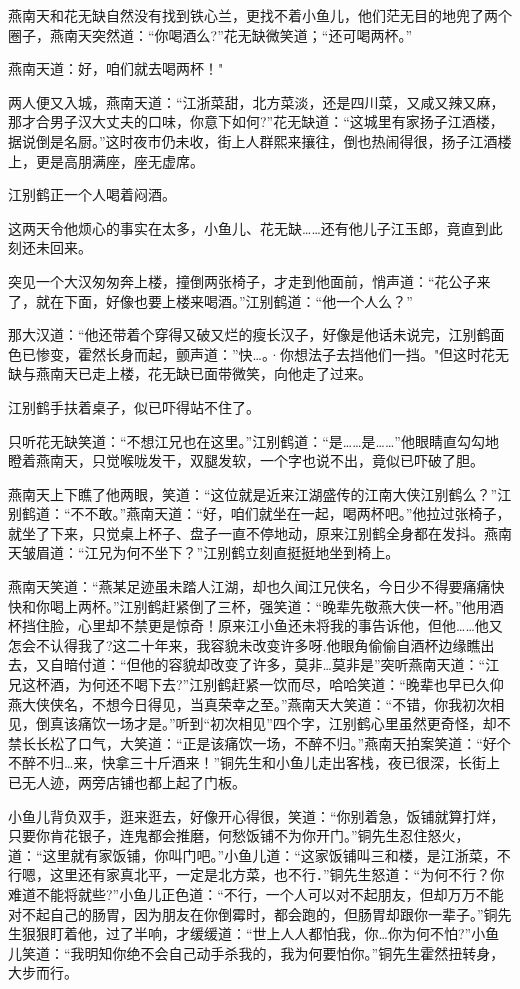 \documentclass[12pt,oneside]{book}
\begin{document}
燕南天和花无缺自然没有找到铁心兰，更找不着小鱼儿，他们茫无目的地兜了两个圈子，燕南天突然道：``你喝酒么?''花无缺微笑道；``还可喝两杯。''

燕南天道：好，咱们就去喝两杯！"

两人便又入城，燕南天道：``江浙菜甜，北方菜淡，还是四川菜，又咸又辣又麻，那才合男子汉大丈夫的口味，你意下如何?''花无缺道：``这城里有家扬子江酒楼，据说倒是名厨。''这时夜市仍未收，街上人群熙来攘往，倒也热闹得很，扬子江酒楼上，更是高朋满座，座无虚席。

江别鹤正一个人喝着闷酒。

这两天令他烦心的事实在太多，小鱼儿、花无缺\ldots\ldots 还有他儿子江玉郎，竟直到此刻还未回来。

突见一个大汉匆匆奔上楼，撞倒两张椅子，才走到他面前，悄声道：``花公子来了，就在下面，好像也要上楼来喝酒。''江别鹤道：``他一个人么？''

那大汉道：``他还带着个穿得又破又烂的瘦长汉子，好像是他话未说完，江别鹤面色已惨变，霍然长身而起，颤声道：''快\ldots。·你想法子去挡他们一挡。"但这时花无缺与燕南天已走上楼，花无缺已面带微笑，向他走了过来。

江别鹤手扶着桌子，似已吓得站不住了。

只听花无缺笑道：``不想江兄也在这里。''江别鹤道：``是\ldots\ldots 是\ldots\ldots{}''他眼睛直勾勾地瞪着燕南天，只觉喉咙发干，双腿发软，一个字也说不出，竟似已吓破了胆。

燕南天上下瞧了他两眼，笑道：``这位就是近来江湖盛传的江南大侠江别鹤么？''江别鹤道：``不不敢。''燕南天道：``好，咱们就坐在一起，喝两杯吧。''他拉过张椅子，就坐了下来，只觉桌上杯子、盘子一直不停地动，原来江别鹤全身都在发抖。燕南天皱眉道：``江兄为何不坐下？''江别鹤立刻直挺挺地坐到椅上。

燕南天笑道：``燕某足迹虽未踏人江湖，却也久闻江兄侠名，今日少不得要痛痛快快和你喝上两杯。''江别鹤赶紧倒了三杯，强笑道：``晚辈先敬燕大侠一杯。''他用酒杯挡住脸，心里却不禁更是惊奇！原来江小鱼还未将我的事告诉他，但他\ldots\ldots 他又怎会不认得我了?这二十年来，我容貌未改变许多呀.他眼角偷偷自酒杯边缘瞧出去，又自暗付道：``但他的容貌却改变了许多，莫非\ldots 莫非是''突听燕南天道：``江兄这杯酒，为何还不喝下去?''江别鹤赶紧一饮而尽，哈哈笑道：``晚辈也早已久仰燕大侠侠名，不想今日得见，当真荣幸之至。''燕南天大笑道：``不错，你我初次相见，倒真该痛饮一场才是。''听到``初次相见''四个字，江别鹤心里虽然更奇怪，却不禁长长松了口气，大笑道：``正是该痛饮一场，不醉不归。''燕南天拍案笑道：``好个不醉不归\ldots 来，快拿三十斤酒来！''铜先生和小鱼儿走出客栈，夜已很深，长街上已无人迹，两旁店铺也都上起了门板。

小鱼儿背负双手，逛来逛去，好像开心得很，笑道：``你别着急，饭铺就算打烊，只要你肯花银子，连鬼都会推磨，何愁饭铺不为你开门。''铜先生忍住怒火，道：``这里就有家饭铺，你叫门吧。''小鱼儿道：``这家饭铺叫三和楼，是江浙菜，不行嗯，这里还有家真北平，一定是北方菜，也不行．''铜先生怒道：``为何不行？你难道不能将就些?''小鱼儿正色道：``不行，一个人可以对不起朋友，但却万万不能对不起自己的肠胃，因为朋友在你倒霉时，都会跑的，但肠胃却跟你一辈子。''铜先生狠狠盯着他，过了半响，才缓缓道：``世上人人都怕我，你\ldots 你为何不怕?''小鱼儿笑道：``我明知你绝不会自己动手杀我的，我为何要怕你。''铜先生霍然扭转身，大步而行。
\end{document}
